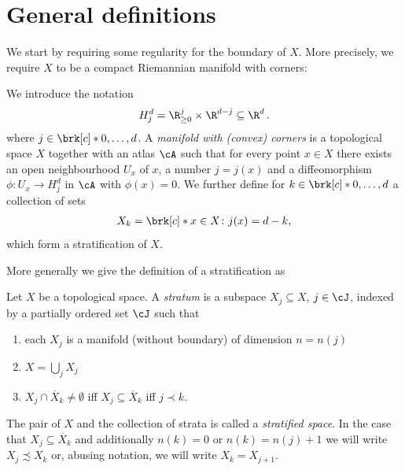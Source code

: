 \section{General definitions}

We start by requiring some regularity for the boundary of $X$.
More precisely, we require $X$ to be a compact Riemannian manifold with corners:
\begin{definition}
  We introduce the notation
  \begin{align*}
    H_j^d=\R_{\geq0}^j\times\R^{d-j}\subseteq\R^d\,.
  \end{align*}
  where $j\in\brk[c]*{0,\dots,d}$.
  A \emph{manifold with (convex) corners} is a topological space $X$ together with an atlas $\cA$ such that for every point
  $x\in X$ there exists an open neighbourhood $U_x$ of $x$, a number $j=j(x)$ and a
  diffeomorphism $\phi\colon U_x\to H_j^d$ in $\cA$ with $\phi(x)=0$.
  We further define for $k\in\brk[c]*{0,\dots,d}$ a collection of sets 
  \begin{align}
    X_k=\brk[c]*{x\in X\colon j(x)=d-k}\label{eq:def_mfCorners_stratification},
  \end{align}
  which form a stratification of $X$.
\end{definition}

More generally we give the definition of a stratification as 
\begin{definition}\label{df:stratified_space}
  Let $X$ be a topological space. A \emph{stratum} is a subspace $X_j\subseteq X$, $j\in\cJ$, indexed by a partially ordered set $\cJ$ such that
  \begin{enumerate}
    \item each $X_j$ is a manifold (without boundary) of dimension $n=n(j)$
    \item $X=\bigcup_jX_j$
    \item $X_j\cap \overline{X}_k\neq\emptyset$ iff $X_j\subseteq\overline{X}_k$ iff $j\prec k$.
  \end{enumerate}
  The pair of $X$ and the collection of strata is called a \emph{stratified space}.
  In the case that $X_j\subseteq\overline{X}_k$ and additionally $n(k)=0$ or $n(k)=n(j)+1$ we will
  write $X_j\precsim X_k$ or, abusing notation, we will write $X_k=X_{j+1}$.
\end{definition}

